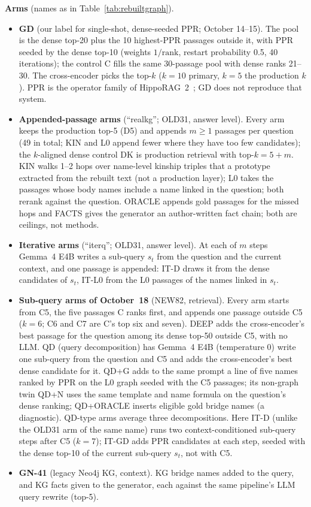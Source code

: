 \textbf{Arms} (names as in Table~\ref{tab:rebuiltgraph}).
\begin{itemize}
\item \textbf{GD} (our label for single-shot, dense-seeded PPR; October 14--15). The
pool is the dense top-20 plus the 10 highest-PPR passages outside it,
with PPR seeded by the dense top-10 (weights $1/\mathrm{rank}$, restart
probability 0.5, 40 iterations); the control C fills the same 30-passage
pool with dense ranks 21--30. The cross-encoder picks the top-$k$
($k=10$ primary, $k=5$ the production $k$). PPR is the operator family
of HippoRAG~2~\cite{gutierrez2025hipporag2}; GD does not reproduce that
system.
\item \textbf{Appended-passage arms} (``realkg''; OLD31, answer level). Every arm keeps the production
top-5 (D5) and appends $m\ge 1$ passages per question (49 in total; KIN
and L0 append fewer where they have too few candidates); the
$k$-aligned dense control DK is production retrieval with top-$k=5+m$. KIN
walks 1--2 hops over name-level kinship triples that a prototype
extracted from the rebuilt text (not a production layer); L0 takes the
passages whose body names include a name linked in the question; both
rerank against the question. ORACLE appends gold passages for the missed
hops and FACTS gives the generator an author-written fact chain; both
are ceilings, not methods.
\item \textbf{Iterative arms} (``iterq''; OLD31, answer level). At each of $m$ steps Gemma~4 E4B
writes a sub-query $s_t$ from the question and the current context, and
one passage is appended: IT-D draws it from the dense candidates of
$s_t$, IT-L0 from the L0 passages of the names linked in $s_t$.
\item \textbf{Sub-query arms of October~18} (NEW82, retrieval). Every arm starts from
C5, the five passages C ranks first, and appends one passage outside C5
($k=6$; C6 and C7 are C's top six and seven). DEEP adds the
cross-encoder's best passage for the question among its dense top-50
outside C5, with no LLM. QD (query decomposition) has Gemma~4 E4B (temperature 0) write one sub-query from
the question and C5 and adds the cross-encoder's best dense candidate for it. QD+G adds
to the same prompt a line of five names ranked by PPR on the L0 graph
seeded with the C5 passages; its non-graph twin QD+N uses the same
template and name formula on the question's dense ranking; QD+ORACLE
inserts eligible gold bridge names (a diagnostic). QD-type arms average
three decompositions. Here IT-D (unlike the OLD31 arm of the same name)
runs two context-conditioned sub-query steps
after C5 ($k=7$); IT-GD adds PPR candidates at each step, seeded with the
dense top-10 of the current sub-query $s_t$, not with C5.
\item \textbf{GN-41} (legacy Neo4j KG, context). KG bridge names added to
the query, and KG facts given to the generator, each against the same
pipeline's LLM query rewrite (top-5).
\end{itemize}

